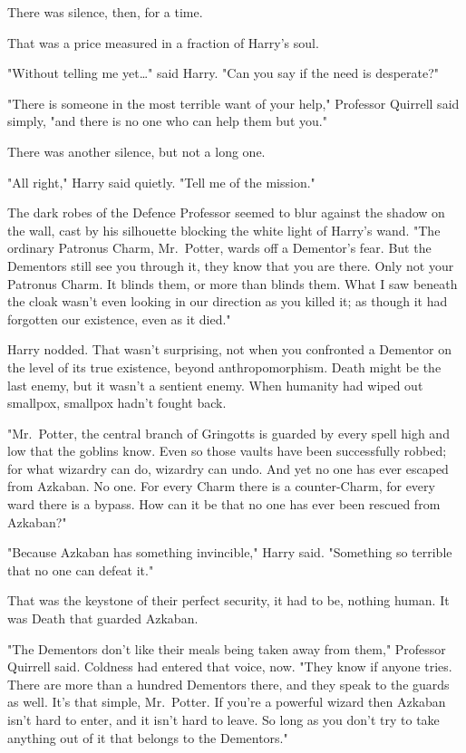 There was silence, then, for a time.

That was a price measured in a fraction of Harry's soul.

"Without telling me yet{\ldots}" said Harry. "Can you say if the need is
desperate?"

"There is someone in the most terrible want of your help," Professor Quirrell
said simply, "and there is no one who can help them but you."

There was another silence, but not a long one.

"All right," Harry said quietly. "Tell me of the mission."

The dark robes of the Defence Professor seemed to blur against the shadow on
the wall, cast by his silhouette blocking the white light of Harry's wand. "The
ordinary Patronus Charm, Mr.~Potter, wards off a Dementor's fear. But the
Dementors still see you through it, they know that you are there. Only not your
Patronus Charm. It blinds them, or more than blinds them. What I saw beneath
the cloak wasn't even looking in our direction as you killed it; as though it
had forgotten our existence, even as it died."

Harry nodded. That wasn't surprising, not when you confronted a Dementor on the
level of its true existence, beyond anthropomorphism. Death might be the last
enemy, but it wasn't a sentient enemy. When humanity had wiped out smallpox,
smallpox hadn't fought back.

"Mr.~Potter, the central branch of Gringotts is guarded by every spell high and
low that the goblins know. Even so those vaults have been successfully robbed;
for what wizardry can do, wizardry can undo. And yet no one has ever escaped
from Azkaban. No one. For every Charm there is a counter-Charm, for every ward
there is a bypass. How can it be that no one has ever been rescued from
Azkaban?"

"Because Azkaban has something invincible," Harry said. "Something so terrible
that no one can defeat it."

That was the keystone of their perfect security, it had to be, nothing human.
It was Death that guarded Azkaban.

"The Dementors don't like their meals being taken away from them," Professor
Quirrell said. Coldness had entered that voice, now. "They know if anyone
tries. There are more than a hundred Dementors there, and they speak to the
guards as well. It's that simple, Mr.~Potter. If you're a powerful wizard then
Azkaban isn't hard to enter, and it isn't hard to leave. So long as you don't
try to take anything out of it that belongs to the Dementors."

